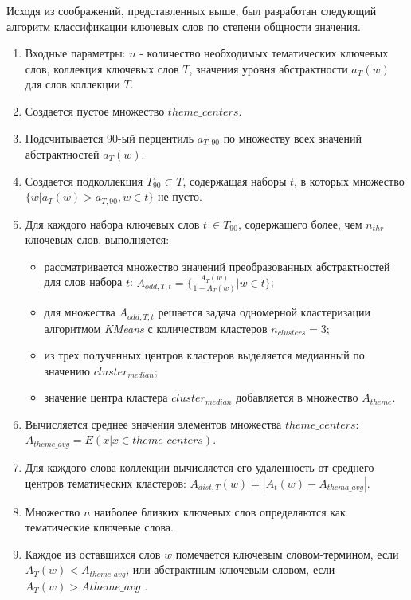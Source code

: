 Исходя из соображений, представленных выше, был разработан следующий алгоритм классификации ключевых слов по степени общности значения.
\begin{enumerate}
    \item Входные параметры: $n$ - количество необходимых тематических ключевых слов, коллекция ключевых слов $T$, значения уровня абстрактности $a_T(w)$ для слов коллекции $T$.
    \item Создается пустое множество $theme\_centers$. 
    \item Подсчитывается 90-ый перцентиль $a_{T,90}$ по множеству всех значений абстрактностей $a_T(w)$.
    \item Создается подколлекция $T_{90} \subset T$, содержащая наборы $t$, в которых множество $\{w | a_T(w) > a_{T,90}, w \in t\}$ не пусто. 
    \item Для каждого набора ключевых слов $t\ \in T_{90}$, содержащего более, чем $n_{thr}$ ключевых слов, выполняется: 
        \begin{itemize}
            \item  рассматривается множество значений преобразованных абстрактностей для слов набора $t$: $A_{odd, T,t} = \{\frac{A_T(w)}{1 - A_T(w)} | w \in t \}$;
            \item  для множества $A_{odd,T,t}$ решается задача одномерной кластеризации алгоритмом \emph{KMeans} с количеством кластеров $n_{clusters} = 3$;
            \item  из трех полученных центров кластеров выделяется медианный по значению $cluster_{median}$;
            \item  значение центра кластера $cluster_{median}$ добавляется в множество $A_{theme}$.
        \end{itemize}
    \item Вычисляется среднее значения элементов множества $theme\_centers$: $A_{theme\_avg} = E(x | x \in theme\_centers)$. 
    \item  Для каждого слова коллекции вычисляется его удаленность от среднего центров тематических кластеров: $A_{dist, T}(w) = |A_{t}(w) - A_{thema\_avg}|$.
    \item  Множество $n$ наиболее близких ключевых слов определяются как тематические ключевые слова.
    \item  Каждое из оставшихся слов $w$ помечается ключевым словом-термином, если $A_T(w) < A_{theme\_avg}$, или абстрактным ключевым словом, если $A_T(w) > A{theme\_avg}$ .
\end{enumerate}

